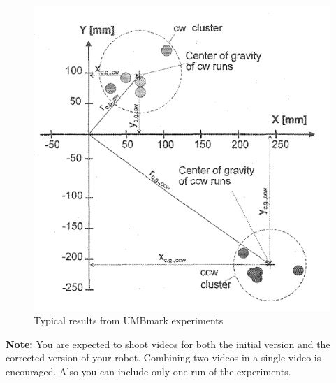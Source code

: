 \documentclass{scrartcl}
\begin{document}
\begin{figure}
\centering
\includegraphics[scale=1]{image/umbmark_plot.png}
\caption{Typical results from UMBmark experiments}
\label{fig:data_plot}
\end{figure}

\textbf{Note:} You are expected to shoot videos for both the initial
version and the corrected version of your robot. Combining two videos in
a single video is encouraged. Also you can include only one run of the experiments.
 
\end{document}
